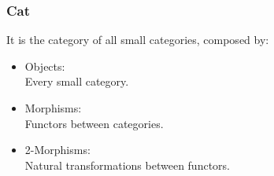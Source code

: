 \subsubsection*{Cat}
It is the category of all small categories, composed by:
\parencite{adamek_herrlich_strecker:joy_cats}
\begin{itemize}
  \item Objects:\\
        Every small category.
  \item Morphisms:\\
        Functors between categories.
  \item 2-Morphisms:\\
        Natural transformations between functors.
\end{itemize}